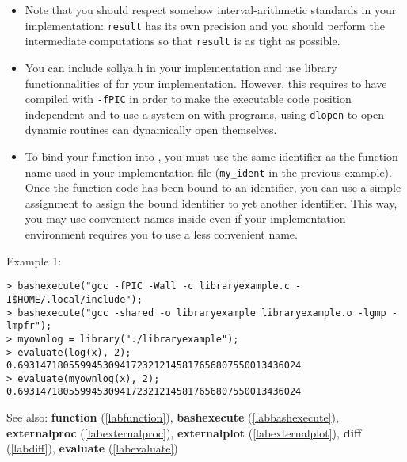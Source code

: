 \begin{itemize}
\item Note that you should respect somehow interval-arithmetic standards in your implementation:
   \verb|result| has its own precision and you should perform the 
   intermediate computations so that \verb|result| is as tight as possible.

\item You can include sollya.h in your implementation and use library 
   functionnalities of \sollya for your implementation. However, this requires to have compiled
   \sollya with \texttt{-fPIC} in order to make the \sollya executable code position 
   independent and to use a system on with programs, using \texttt{dlopen} to open
   dynamic routines can dynamically open themselves.

\item To bind your function into \sollya, you must use the same identifier as the
   function name used in your implementation file (\verb|my_ident| in the previous
   example). Once the function code has been bound to an identifier, you can use a simple assignment
   to assign the bound identifier to yet another identifier. This way, you may use convenient
   names inside \sollya even if your implementation environment requires you to use a less
   convenient name.
\end{itemize}
\noindent Example 1: 
\begin{center}\begin{minipage}{15cm}\begin{Verbatim}[frame=single]
> bashexecute("gcc -fPIC -Wall -c libraryexample.c -I$HOME/.local/include");
> bashexecute("gcc -shared -o libraryexample libraryexample.o -lgmp -lmpfr");
> myownlog = library("./libraryexample");
> evaluate(log(x), 2);
0.69314718055994530941723212145817656807550013436024
> evaluate(myownlog(x), 2);
0.69314718055994530941723212145817656807550013436024
\end{Verbatim}
\end{minipage}\end{center}
See also: \textbf{function} (\ref{labfunction}), \textbf{bashexecute} (\ref{labbashexecute}), \textbf{externalproc} (\ref{labexternalproc}), \textbf{externalplot} (\ref{labexternalplot}), \textbf{diff} (\ref{labdiff}), \textbf{evaluate} (\ref{labevaluate})
